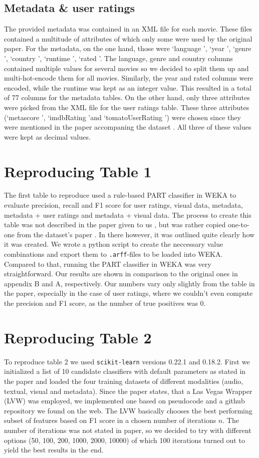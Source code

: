 \documentclass[sigconf]{acmart}
\begin{document}
\subsection{Metadata \& user ratings}
The provided metadata was contained in an XML file for each movie. These files contained a multitude of attributes of which only some were used by the original paper. For the metadata, on the one hand, those were \lq language \rq, \lq year \rq, \lq genre \rq, \lq country \rq, \lq runtime \rq, \lq rated \rq. The language, genre and country columns contained multiple values for several movies so we decided to split them up and multi-hot-encode them for all movies. Similarly, the year and rated columns were encoded, while the runtime was kept as an integer value. This resulted in a total of 77 columns for the metadata tables.
On the other hand, only three attributes were picked from the XML file for the user ratings table. These three attributes (\lq metascore \rq, \lq imdbRating \rq and \lq tomatoUserRating \rq) were chosen since they were mentioned in the paper accompaning the dataset \cite{Dataset}. All three of these values were kept as decimal values.

\newpage
\section{Reproducing Table 1}
The first table to reproduce used a rule-based PART classifier in WEKA to evaluate precision, recall and F1 score for user ratings, visual data, metadata, metadata + user ratings and metadata + visual data. The process to create this table was not described in the paper given to us \cite{MediaEval}, but was rather copied one-to-one from the dataset's paper \cite{Dataset}. In there however, it was outlined quite clearly how it was created. We wrote a python script to create the neccessary value combinations and export them to \texttt{.arff}-files to be loaded into WEKA. Compared to that, running the PART classifier in WEKA was very straightforward. Our results are shown in comparison to the original ones in appendix B and A, respectively. Our numbers vary only slightly from the table in the paper, especially in the case of user ratings, where we couldn't even compute the precision and F1 score, as the number of true positives was 0.

\section{Reproducing Table 2}
To reproduce table 2 we used \texttt{scikit-learn} versions 0.22.1 and 0.18.2. First we initialized a list of 10 candidate classifiers with default parameters as stated in the paper and loaded the four training datasets of different modalities (audio, textual, visual and metadata). Since the paper states, that a Las Vegas Wrapper (LVW) was employed, we implemented one based on pseudocode and a github repository we found on the web. The LVW basically chooses the best performing subset of features based on F1 score in a chosen number of iterations $n$. The number of iterations was not stated in paper, so we decided to try with different options (50, 100,  200, 1000, 2000, 10000) of which 100 iterations turned out to yield the best results in the end.
\end{document}
